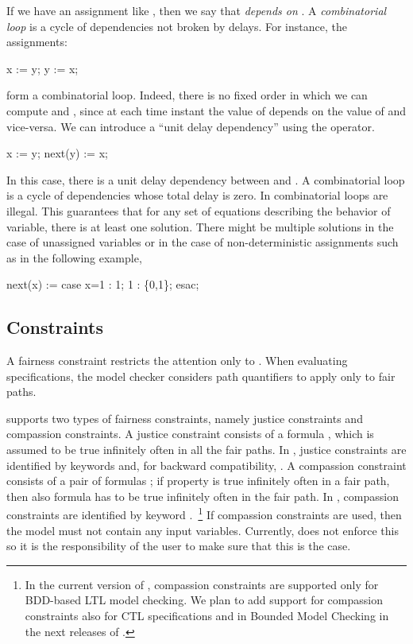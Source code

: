 If we have an assignment like  \reserved{:=} 
\reserved{;}, then we say that  \emph{depends on} . A
\emph{combinatorial loop} is a cycle of dependencies not broken by
delays. For instance, the assignments:
%
\begin{nusmvCode}
x := y;
y := x;
\end{nusmvCode}
%
form a combinatorial loop. Indeed, there is no fixed order in which we
can compute  and , since at each time instant the
value of  depends on the value of  and vice-versa. We
can introduce a ``unit delay dependency'' using the 
operator.
%
\begin{nusmvCode}
      x := y;
next(y) := x;
\end{nusmvCode}
%
In this case, there is a unit delay dependency between  and
. 
%
A combinatorial loop is a cycle of dependencies whose total delay is
zero. In \nusmv combinatorial loops are illegal. This guarantees that
for any set of equations describing the behavior of variable, there is
at least one solution. There might be multiple solutions in the case
of unassigned variables or in the case of non-deterministic
assignments such as in the following example,
%
\begin{nusmvCode}
    next(x) := case x=1 : 1;
                    1 : \{0,1\};
               esac;
\end{nusmvCode}



\subsection{ Constraints}
\label{FAIRNESS Constraints}
%
A fairness constraint restricts the attention only to . When evaluating specifications, the model checker
considers path quantifiers to apply only to fair paths.

\nusmv supports two types of fairness constraints, namely justice
constraints and compassion constraints. 
%
A justice constraint consists of a formula , which is assumed
to be true infinitely often in all the fair paths.
%
In \nusmv, justice constraints are identified by
keywords  and, for backward compatibility,
.
%
A compassion constraint consists of a pair of formulas ;
if property  is true infinitely often in a fair path, then
also formula  has to be true infinitely often in the fair
path.
%
In \nusmv, compassion constraints are identified by keyword
.~\footnote{In the current version of \nusmv,
compassion constraints are supported only for BDD-based LTL model
checking. We plan to add support for compassion constraints also for
CTL specifications and in Bounded Model Checking in the next releases
of \nusmv.} 
%
If compassion constraints are used, then the model must not contain any
input variables. 
%
Currently, \nusmv does not enforce this so it is the responsibility of
the user to make sure that this is the case.

